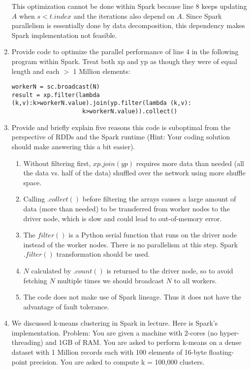 \documentclass[11 pt, a4paper]{article}  %
\begin{document}
\begin{enumerate}
This optimization cannot be done within Spark because line 8 keeps updating $A$ when $s < t.index$ and the iterations also depend on $A$. Since Spark parallelism is essentially done by data decomposition, this dependency makes Spark implementation not feasible.\\



\newpage
\item Provide code to optimize the parallel performance of line 4 in the following program within Spark. Treat both xp and yp as though they were of equal length and each $>$ 1 Million elements:

\begin{verbatim}
workerN = sc.broadcast(N)
result = xp.filter(lambda (k,v):k>workerN.value).join(yp.filter(lambda (k,v):
                    k>workerN.value)).collect()
\end{verbatim}


\item Provide and briefly explain five reasons this code is suboptimal from the perspective of RDDs and the Spark runtime (Hint: Your coding solution should make answering this a bit easier).
\begin{enumerate}
\item Without filtering first, $xp.join(yp)$ requires more data than needed (all the data vs. half of the data) shuffled over the network using more shuffle space.
\item Calling $.collect()$ before filtering the arrays causes a large amount of data (more than needed) to be transferred from worker nodes to the driver node, which is slow and could lead to out-of-memory error.
\item The $filter()$ is a Python serial function that runs on the driver node instead of the worker nodes. There is no parallelism at this step. Spark $.filter()$ transformation should be used.
\item $N$ calculated by $.count()$ is returned to the driver node, so to avoid fetching $N$ multiple times we should broadcast $N$ to all workers.
\item The code does not make use of Spark lineage. Thus it does not have the advantage of fault tolerance.

\end{enumerate}


\newpage
\item We discussed k-means clustering in Spark in lecture. Here is Spark's implementation. Problem: You are given a machine with 2-cores (no hyper-threading) and 1GB of RAM. You are asked to perform k-means on a dense dataset with 1 Million records each with 100 elements of 16-byte floating-point precision. You are asked to compute k = 100,000 clusters.


\end{enumerate}
\end{document}
